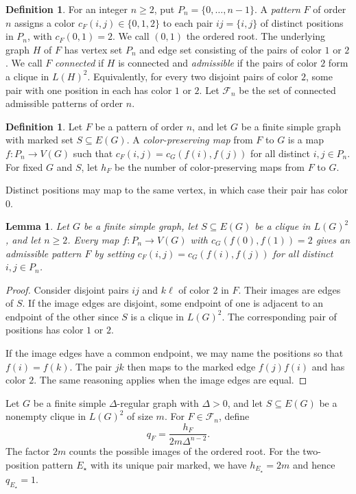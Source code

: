 \documentclass[preprint,11pt,numbers]{elsarticle-arxiv}
\numberwithin{equation}{section}
\newtheorem{lemma}[theorem]{Lemma}
\theoremstyle{definition}
\newtheorem{defn}[theorem]{Definition}
\begin{document}
\begin{defn}\label{def:patterns}
For an integer $n\geq2$, put $P_n=\{0,\ldots,n-1\}$. A \emph{pattern}
$F$ of order $n$ assigns a color $c_F(i,j)\in\{0,1,2\}$ to each pair
$ij=\{i,j\}$ of distinct positions in $P_n$, with $c_F(0,1)=2$. We
call $(0,1)$ the ordered root. The underlying graph $H$ of $F$ has
vertex set $P_n$ and edge set consisting of the pairs of color $1$
or $2$. We call $F$ \emph{connected} if $H$ is connected and
\emph{admissible} if the pairs of color $2$ form a clique in $L(H)^2$.
Equivalently, for every two disjoint pairs of color $2$, some pair
with one position in each has color $1$ or $2$.
Let $\mathcal F_n$ be the set of connected admissible patterns of order $n$.
\end{defn}

\begin{defn}\label{def:color-preserving-maps}
Let $F$ be a pattern of order $n$, and let $G$ be a finite simple graph
with marked set $S\subseteq E(G)$. A \emph{color-preserving map} from $F$
to $G$ is a map $f\colon P_n\to V(G)$ such that
$c_F(i,j)=c_G(f(i),f(j))$ for all distinct $i,j\in P_n$.
For fixed $G$ and $S$, let $h_F$ be the number of color-preserving maps
from $F$ to $G$.
\end{defn}

Distinct positions may map to the same vertex, in which case their
pair has color $0$.

\begin{lemma}\label{lem:pullback}
Let $G$ be a finite simple graph, let $S\subseteq E(G)$ be a clique
in $L(G)^2$, and let $n\geq 2$. Every map $f\colon P_n\to V(G)$ with
$c_G(f(0),f(1))=2$ gives an admissible pattern $F$ by setting
$c_F(i,j)=c_G(f(i),f(j))$ for all distinct $i,j\in P_n$.
\end{lemma}

\begin{proof}
Consider disjoint pairs $ij$ and $k\ell$ of color $2$ in $F$. Their
images are edges of $S$. If the image edges are disjoint, some
endpoint of one is adjacent to an endpoint of the other since $S$
is a clique in $L(G)^2$. The corresponding pair of positions has
color $1$ or $2$.

If the image edges have a common endpoint, we may name the positions
so that $f(i)=f(k)$. The pair $jk$ then maps to the marked edge
$f(j)f(i)$ and has color $2$. The same reasoning applies when the
image edges are equal.
\end{proof}

Let $G$ be a finite simple $\Delta$-regular graph with $\Delta>0$,
and let $S\subseteq E(G)$ be a nonempty clique in $L(G)^2$ of size $m$.
For $F\in\mathcal F_n$, define
\begin{equation}\label{eq:q-definition}
 q_F=\frac{h_F}{2m\Delta^{n-2}}.
\end{equation}
The factor $2m$ counts the possible images of the ordered root.
For the two-position pattern $E_\star$ with its unique pair marked,
we have $h_{E_\star}=2m$ and hence $q_{E_\star}=1$.
\end{document}
